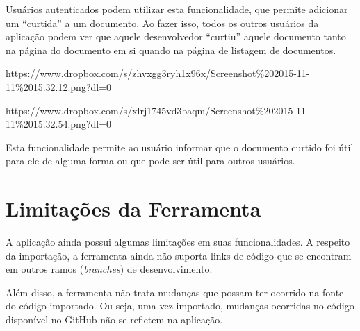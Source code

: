 Usuários autenticados podem utilizar esta funcionalidade, que permite adicionar um ``curtida'' a um documento. Ao fazer isso, todos os outros usuários da aplicação podem ver que aquele desenvolvedor ``curtiu'' aquele documento tanto na página do documento em si quando na página de listagem de documentos.

https://www.dropbox.com/s/zhvxgg3ryh1x96x/Screenshot\%202015-11-11\%2015.32.12.png?dl=0

https://www.dropbox.com/s/xlrj1745vd3baqm/Screenshot\%202015-11-11\%2015.32.54.png?dl=0

Esta funcionalidade permite ao usuário informar que o documento curtido foi útil para ele de alguma forma ou que pode ser útil para outros usuários.

\section{Limitações da Ferramenta}

A aplicação ainda possui algumas limitações em suas funcionalidades. A respeito da importação, a ferramenta ainda não suporta links de código que se encontram em outros ramos (\textit{branches}) de desenvolvimento.

Além disso, a ferramenta não trata mudanças que possam ter ocorrido na fonte do código importado. Ou seja, uma vez importado, mudanças ocorridas no código disponível no GitHub não se refletem na aplicação.

